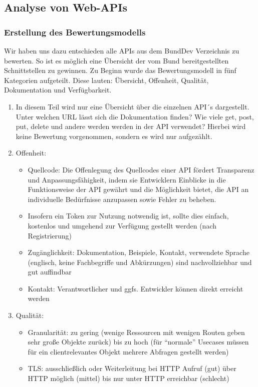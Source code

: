 \documentclass[notitlepage, hidelinks]{article}
\begin{document}
\subsection{Analyse von Web-APIs}

\subsubsection{Erstellung des Bewertungsmodells}

Wir haben uns dazu entschieden alle APIs aus dem BundDev Verzeichnis zu bewerten. So ist es möglich eine Übersicht der vom Bund bereitgestellten Schnittstellen zu gewinnen. Zu Beginn wurde das Bewertungsmodell in fünf Kategorien aufgeteilt. Diese lauten: Übersicht, Offenheit, Qualität, Dokumentation und Verfügbarkeit.

\begin{enumerate}
\item In diesem Teil wird nur eine Übersicht über die einzelnen API´s dargestellt. Unter welchen URL lässt sich die Dokumentation finden? Wie viele get, post, put, delete und andere werden werden in der API verwendet? Hierbei wird keine Bewertung vorgenommen, sondern es wird nur aufgezählt.
\item Offenheit: 
\begin{itemize}
\item Quellcode: Die Offenlegung des Quellcodes einer API fördert Transparenz und Anpassungsfähigkeit, indem sie Entwicklern Einblicke in die Funktionsweise der API gewährt und die Möglichkeit bietet, die API an individuelle Bedürfnisse anzupassen sowie Fehler zu beheben.
\item Insofern ein Token zur Nutzung notwendig ist, sollte dies einfach, kostenlos und umgehend zur Verfügung gestellt werden (nach Registrierung)
\item Zugänglichkeit: Dokumentation, Beispiele, Kontakt, verwendete Sprache (englisch, keine Fachbegriffe und Abkürzungen) sind nachvollziehbar und gut auffindbar
\item Kontakt: Verantwortlicher und ggfs. Entwickler können direkt erreicht werden
\end{itemize}
\item Qualität: 
\begin{itemize}
\item Granularität: zu gering (wenige Ressourcen mit wenigen Routen geben sehr große Objekte zurück) bis zu hoch (für ``normale'' Usecases müssen für ein clientrelevantes Objekt mehrere Abfragen gestellt werden)
\item TLS: ausschließlich oder Weiterleitung bei HTTP Aufruf (gut) über HTTP möglich (mittel) bis nur unter HTTP erreichbar (schlecht)

\end{itemize}
\end{enumerate}
\end{document}
